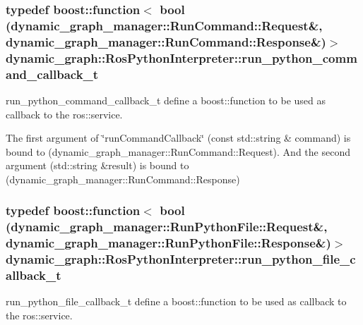 \subsubsection[{\texorpdfstring{run\+\_\+python\+\_\+command\+\_\+callback\+\_\+t}{run_python_command_callback_t}}]{\setlength{\rightskip}{0pt plus 5cm}typedef boost\+::function$<$ bool (dynamic\+\_\+graph\+\_\+manager\+::\+Run\+Command\+::\+Request\&, dynamic\+\_\+graph\+\_\+manager\+::\+Run\+Command\+::\+Response\&)$>$ {\bf dynamic\+\_\+graph\+::\+Ros\+Python\+Interpreter\+::run\+\_\+python\+\_\+command\+\_\+callback\+\_\+t}}\hypertarget{classdynamic__graph_1_1RosPythonInterpreter_aa9fcb34973d84db722fa39803d11c00d}{}\label{classdynamic__graph_1_1RosPythonInterpreter_aa9fcb34973d84db722fa39803d11c00d}


run\+\_\+python\+\_\+command\+\_\+callback\+\_\+t define a boost\+::function to be used as callback to the ros\+::service. 

The first argument of \char`\"{}run\+Command\+Callback\char`\"{} (const std\+::string \& command) is bound to (dynamic\+\_\+graph\+\_\+manager\+::\+Run\+Command\+::\+Request). And the second argument (std\+::string \&result) is bound to (dynamic\+\_\+graph\+\_\+manager\+::\+Run\+Command\+::\+Response) 
\subsubsection[{\texorpdfstring{run\+\_\+python\+\_\+file\+\_\+callback\+\_\+t}{run_python_file_callback_t}}]{\setlength{\rightskip}{0pt plus 5cm}typedef boost\+::function$<$ bool (dynamic\+\_\+graph\+\_\+manager\+::\+Run\+Python\+File\+::\+Request\&, dynamic\+\_\+graph\+\_\+manager\+::\+Run\+Python\+File\+::\+Response\&)$>$ {\bf dynamic\+\_\+graph\+::\+Ros\+Python\+Interpreter\+::run\+\_\+python\+\_\+file\+\_\+callback\+\_\+t}}\hypertarget{classdynamic__graph_1_1RosPythonInterpreter_a802128e670817aa48dd8db54830a7977}{}\label{classdynamic__graph_1_1RosPythonInterpreter_a802128e670817aa48dd8db54830a7977}


run\+\_\+python\+\_\+file\+\_\+callback\+\_\+t define a boost\+::function to be used as callback to the ros\+::service. 

